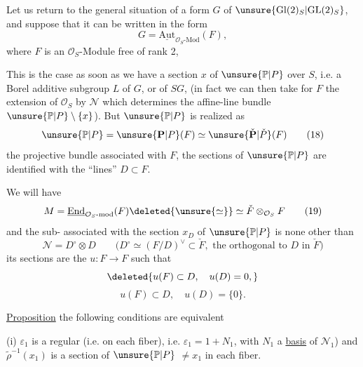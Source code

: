 
Let us return to the general situation of a form $G$ of $\unsure{\mathrm{Gl}(2)_S|\mathrm{GL}(2)_S}$, and suppose that it can be written in the form
\[
G=\underline{\mathrm{Aut}}_{\mathcal O_S\text{-Mod}}(F), \tag{17}
\]
where $F$ is an $\mathcal O_S$-Module  free of rank 2,

This is the case as soon as we have a section $x$ of $\unsure{\mathbb P|P}$ over $S$, i.e. a Borel additive subgroup $L$ of $G$, or of $SG$, (in fact we can then take for $F$ the extension of $\mathcal O_S$ by $\mathcal N$ which determines the affine-line bundle $\unsure{\mathbb P|P}\setminus\{x\}$). But  $\unsure{\mathbb P|P}$ is realized as 
\[
\unsure{\mathbb P|P}=\unsure{\mathbf P|P}(F)\simeq\unsure{\check{\mathbf P}|\check P}(F) \tag{18}
\]
the projective bundle associated with $F$,   the sections of $\unsure{\mathbb P|P}$ are identified with the ``lines'' $D\subset F$.

We will have
\[
M=\underline{\mathrm{End}}_{\mathcal O_S\text{-mod}}(F)\deleted{\unsure{\simeq}}\simeq\check F\otimes_{\mathcal O_S}F \tag{19}
\]
and the sub-  associated with the section $x_D$ of $\unsure{\mathbb P|P}$  is none other than 
\[
\mathcal N=D^\circ\otimes D
\qquad\bigl(D^\circ\simeq(F/D)^\vee\subset\check F,\text{ the orthogonal to }D\text{ in }\check F\bigr) \tag{20}
\]
its sections are the $u:F\longrightarrow F$ such that
\[
\deleted{u(F)\subset D,\quad u(D)=0,}
\]
\[
u(F)\subset D,\quad u(D)=\{0\}. \tag{21}
\]


\uline{Proposition}   the following conditions are equivalent

(i) $\varepsilon_1$ is  a regular  (i.e.   on each fiber), i.e. $\varepsilon_1=1+N_1$, with $N_1$ a \uline{basis} of $\mathcal N_1$) and $\widetilde\rho^{-1}(x_1)$ is a section of $\unsure{\mathbb P|P}$  $\ne x_1$ in each fiber.

